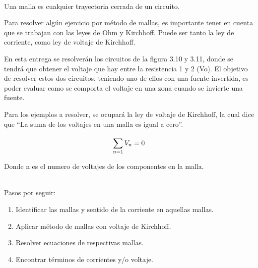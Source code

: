 \newpage
\begin{example}
\\


Una malla es cualquier trayectoria cerrada de un circuito.

Para resolver algún ejercicio por método de mallas, es importante tener en cuenta que se trabajan con las leyes de Ohm y Kirchhoff. Puede ser tanto la ley de corriente, como ley de voltaje de Kirchhoff.
\iffalse
\begin{figure}[H]
    \centering
  \begin{subfigure}{\textwidth}
    \texttt{[image: SinFuenteinvertida.PNG]}
    \caption{Ejemplo a resolver sin invertir una fuente}
    \label{fig:Imagen1}
  \end{subfigure}
  
  \begin{subfigure}{\textwidth}
    \texttt{[image: ConFuenteinvertida.PNG]}
    \caption{Ejemplo a resolver con una fuente invertida}
    \label{fig:Imagen2}
  \end{subfigure}
  
\end{figure}
\fi
En esta entrega se resolverán los circuitos de la figura 3.10 y 3.11, donde se tendrá que obtener el voltaje que hay entre la resistencia 1 y 2 (Vo). El objetivo de resolver estos dos circuitos, teniendo uno de ellos con una fuente invertida, es poder evaluar como se comporta el voltaje en una zona cuando se invierte una fuente.


Para los ejemplos a resolver, se ocupará la ley de voltaje de Kirchhoff, la cual dice que “La suma de los voltajes en una malla es igual a cero”.

\begin {equation*}
\notag
\displaystyle\sum_{n=1}^{} V_n=0
\end {equation*}
\begin{center}
Donde n es el numero de voltajes de los componentes en la malla.
\end{center}
\\
Pasos por seguir:
\begin{enumerate}
    \item Identificar las mallas y sentido de la corriente en aquellas mallas.
    \item Aplicar método de mallas con voltaje de Kirchhoff.
    \item Resolver ecuaciones de respectivas mallas.
    \item Encontrar términos de corrientes y/o voltaje.


\end{enumerate}
\end{example}
